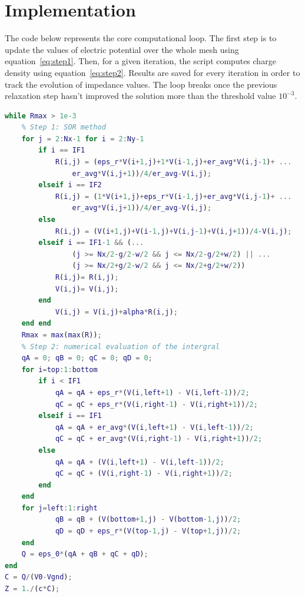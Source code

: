\documentclass[11pt,a4paper]{article}
\begin{document}
\newpage\section{Implementation}
The code below represents the core computational loop. The first step is to update the values of electric potential over the whole mesh using equation~\ref{eq:step1}. Then, for a given iteration, the script computes charge density using equation~\ref{eq:step2}. Results are saved for every iteration in order to track the evolution of impedance values. The loop breaks once the previous relaxation step hasn't improved the solution more than the threshold value $10^{-3}$.
\begin{lstlisting}[language=Matlab]
while Rmax > 1e-3
    % Step 1: SOR method
    for j = 2:Nx-1 for i = 2:Ny-1
        if i == IF1
            R(i,j) = (eps_r*V(i+1,j)+1*V(i-1,j)+er_avg*V(i,j-1)+ ...
                er_avg*V(i,j+1))/4/er_avg-V(i,j); 
        elseif i == IF2
            R(i,j) = (1*V(i+1,j)+eps_r*V(i-1,j)+er_avg*V(i,j-1)+ ...
                er_avg*V(i,j+1))/4/er_avg-V(i,j); 
        else
            R(i,j) = (V(i+1,j)+V(i-1,j)+V(i,j-1)+V(i,j+1))/4-V(i,j);
        elseif i == IF1-1 && (...
                (j >= Nx/2-g/2-w/2 && j <= Nx/2-g/2+w/2) || ...
                (j >= Nx/2+g/2-w/2 && j <= Nx/2+g/2+w/2))
            R(i,j)= R(i,j);
            V(i,j)= V(i,j);
        end
            V(i,j) = V(i,j)+alpha*R(i,j);
    end end
    Rmax = max(max(R));
    % Step 2: numerical evaluation of the intergral
    qA = 0; qB = 0; qC = 0; qD = 0;
    for i=top:1:bottom
        if i < IF1
            qA = qA + eps_r*(V(i,left+1) - V(i,left-1))/2;
            qC = qC + eps_r*(V(i,right-1) - V(i,right+1))/2;
        elseif i == IF1
            qA = qA + er_avg*(V(i,left+1) - V(i,left-1))/2;
            qC = qC + er_avg*(V(i,right-1) - V(i,right+1))/2;
        else
            qA = qA + (V(i,left+1) - V(i,left-1))/2;
            qC = qC + (V(i,right-1) - V(i,right+1))/2;
        end
    end
    for j=left:1:right
            qB = qB + (V(bottom+1,j) - V(bottom-1,j))/2;
            qD = qD + eps_r*(V(top-1,j) - V(top+1,j))/2;
    end
    Q = eps_0*(qA + qB + qC + qD);
end
C = Q/(V0-Vgnd);
Z = 1./(c*C);
\end{lstlisting}
\end{document}

